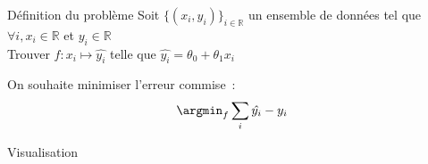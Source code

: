 \begin{frame}{Définition du problème}
  Soit $\{(x_i, y_i)\}_{i \in \mathbb{R}}$ un ensemble de données tel que $\forall i, x_i \in \mathbb{R}$ et $y_i \in \mathbb{R}$ \\

  Trouver $f: x_i \mapsto \hat{y_i}$ telle que $\hat{y_i} = \theta_0 + \theta_1 x_i$

  On souhaite minimiser l'erreur commise~:
  \[
    \argmin_f \sum_i \hat{y_i} - y_i
  \]
\end{frame}

\begin{frame}{Visualisation}
\end{frame}
